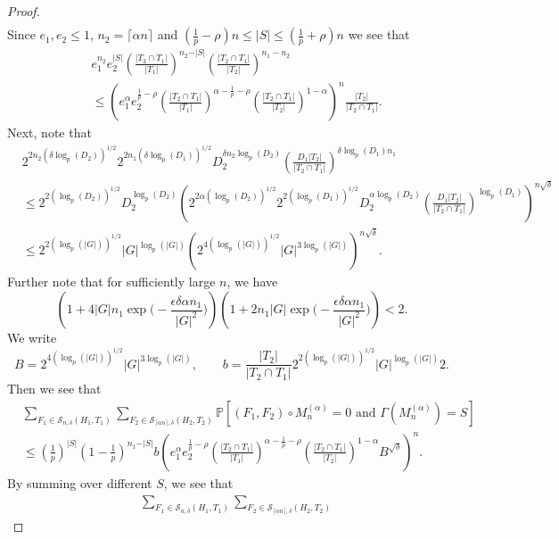 \documentclass[12pt]{amsart}
\theoremstyle{definition}
\newcommand{\PPP}{\mathbb{P}}
\newcommand{\SSS}[3]{\mathcal{S}_{#1}(#2,#3)}
\newcommand{\Mna}{M_{n}^{(\alpha)}}
\newcommand{\abs}[1]{\vert#1\vert}
\newcommand{\ceil}[1]{\lceil#1\rceil}
\begin{document}
\begin{proof}
\begin{align*}
\end{align*}
Since $e_1,e_2\leq 1$, $n_2=\ceil{\alpha n}$ and $(\frac{1}{p}-\rho)n \leq \abs{S}\leq (\frac{1}{p}+\rho)n$ we see that
\begin{align*}
&e_1^{n_2} e_2^{\abs{S}}
\left(\frac{\abs{T_2\cap T_1}}{\abs{T_1}}\right)^{n_2-\abs{S}}
\left(\frac{\abs{T_2\cap T_1}}{\abs{T_2}}\right)^{n_1-n_2}\\
&\leq 
\left(
e_1^{\alpha} e_2^{\frac{1}{p}-\rho}
\left(\frac{\abs{T_2\cap T_1}}{\abs{T_1}}\right)^{\alpha-\frac{1}{p}-\rho}
\left(\frac{\abs{T_2\cap T_1}}{\abs{T_2}}\right)^{1-\alpha}
\right)^n
\frac{\abs{T_2}}{\abs{T_2\cap T_1}}.
\end{align*}
Next, note that
\begin{align*}
&2^{2n_2(\delta\log_p(D_2))^{1/2}}
2^{2n_1(\delta\log_p(D_1))^{1/2}}
D_2^{\delta n_2\log_p(D_2)}
\left(\frac{D_1 \abs{T_2}}{\abs{T_2\cap T_1}}\right)^{\delta\log_p(D_1) n_1}\\
&\leq 2^{2(\log_p(D_2))^{1/2}} D_2^{\log_p(D_2)}
\left(
2^{2\alpha(\log_p(D_2))^{1/2}}
2^{2(\log_p(D_1))^{1/2}}
D_2^{\alpha\log_p(D_2)}
\left(\frac{D_1 \abs{T_2}}{\abs{T_2\cap T_1}}\right)^{\log_p(D_1)}
\right)^{n\sqrt{\delta}}\\
&\leq 2^{2(\log_p(\abs{G}))^{1/2}} \abs{G}^{\log_p(\abs{G})}
\left(
2^{4(\log_p(\abs{G}))^{1/2}}
\abs{G}^{3\log_p(\abs{G})}
\right)^{n\sqrt{\delta}}.
\end{align*}
Further note that for sufficiently large $n$, we have
\[
\left(1+4\abs{G}n_1 \exp\Big(-\frac{\epsilon \delta \alpha n_1}{|G|^2}\Big) \right)
\left(1+2n_1\abs{G}\exp\Big(-\frac{\epsilon\delta \alpha n_1}{|G|^2}\Big)\right)
<2.
\]
We write
\[
B=2^{4(\log_p(\abs{G}))^{1/2}}
\abs{G}^{3\log_p(\abs{G})},\quad\quad
b=\frac{\abs{T_2}}{\abs{T_2\cap T_1}}
2^{2(\log_p(\abs{G}))^{1/2}} \abs{G}^{\log_p(\abs{G})} 
2.
\]
Then we see that
\begin{align*}
&\sum_{F_1\in \SSS{n,\delta}{H_1}{T_1}}
\sum_{F_2\in \SSS{\ceil{\alpha n},\delta}{H_2}{T_2}}
\PPP[(F_1,F_2)\circ \Mna=0 \text{ and } \Gamma(\Mna)=S]\\
&\leq (\tfrac{1}{p})^{\abs{S}}  
(1-\tfrac{1}{p})^{n_1-\abs{S}}
b \left(
e_1^{\alpha} e_2^{\frac{1}{p}-\rho}
\left(\frac{\abs{T_2\cap T_1}}{\abs{T_1}}\right)^{\alpha-\frac{1}{p}-\rho}
\left(\frac{\abs{T_2\cap T_1}}{\abs{T_2}}\right)^{1-\alpha}
B^{\sqrt{\delta}}
\right)^n.
\end{align*}
By summing over different $S$, we see that
\begin{align*}
&\sum_{F_1\in \SSS{n,\delta}{H_1}{T_1}}
\sum_{F_2\in \SSS{\ceil{\alpha n},\delta}{H_2}{T_2}}

\end{align*}
\end{proof}
\end{document}
